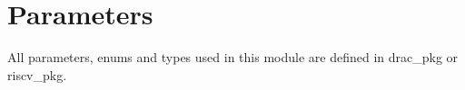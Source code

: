 \section{Parameters}
\label{chapter3}

All parameters, enums and types used in this module are defined in drac\_pkg or riscv\_pkg.